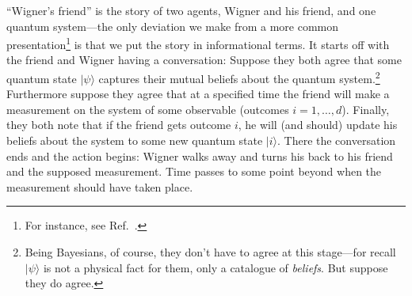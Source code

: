 \documentclass[aps,pra,superscriptaddress,10pt,tightenlines,twocolumn,nofootinbib]{revtex4}
\begin{document}
``Wigner's friend'' is the story of two agents, Wigner and his friend, and one quantum system---the only deviation we make from a more common presentation\footnote{For instance, see Ref.\ \cite{Albert94}.} is that we put the story in informational terms.  It starts off with the friend and Wigner having a conversation:  Suppose they both agree that some quantum state $|\psi\rangle$ captures their mutual beliefs about the quantum system.\footnote{Being Bayesians, of course, they don't have to agree at this stage---for recall $|\psi\rangle$ is not a physical fact for them, only a catalogue of {\it beliefs}.  But suppose they do agree.} Furthermore suppose they agree that at a specified time the friend will make a measurement on the system of some observable (outcomes $i=1,\ldots,d$).  Finally, they both note that if the friend gets outcome $i$, he will (and should) update his beliefs about the system to some new quantum state $|i\rangle$.  There the conversation ends and the action begins:  Wigner walks away and turns his back to his friend and the supposed measurement.  Time passes to some point beyond when the measurement should have taken place.
\end{document}
